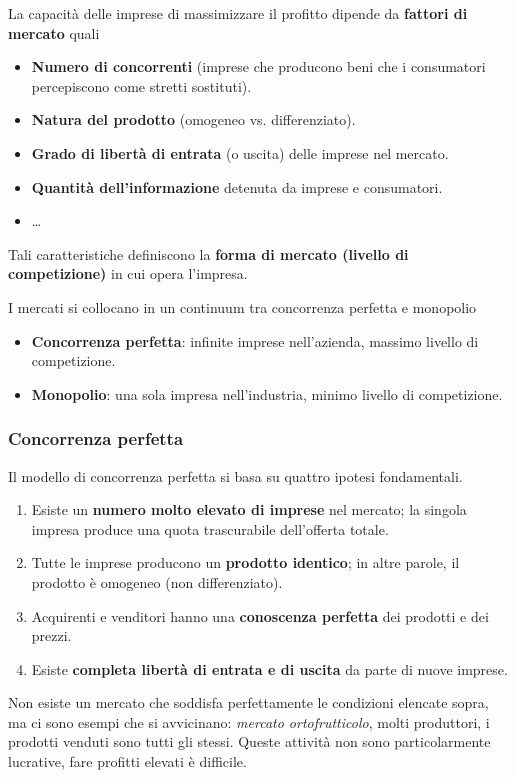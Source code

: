 \documentclass[../main.tex]{subfiles}
\begin{document}
La capacità delle imprese di massimizzare il profitto dipende da \textbf{fattori di mercato} quali
\begin{itemize}
    \item \textbf{Numero di concorrenti} (imprese che producono beni che i consumatori percepiscono come stretti sostituti).
    \item \textbf{Natura del prodotto} (omogeneo vs. differenziato).
    \item \textbf{Grado di libertà di entrata} (o uscita) delle imprese nel mercato.
    \item \textbf{Quantità dell'informazione} detenuta da imprese e consumatori.
    \item \dots
\end{itemize}

Tali caratteristiche definiscono la \textbf{forma di mercato (livello di competizione)} in cui opera l'impresa.

I mercati si collocano in un continuum tra concorrenza perfetta e monopolio
\begin{itemize}
    \item \textbf{Concorrenza perfetta}: infinite imprese nell'azienda, massimo livello di competizione.
    \item \textbf{Monopolio}: una sola impresa nell'industria, minimo livello di competizione.
\end{itemize}

\subsubsection{Concorrenza perfetta}

Il modello di concorrenza perfetta si basa su quattro ipotesi fondamentali.
\begin{enumerate}
    \item Esiste un \textbf{numero molto elevato di imprese} nel mercato; la singola impresa produce una quota trascurabile dell'offerta totale.
    \item Tutte le imprese producono un \textbf{prodotto identico}; in altre parole, il prodotto è omogeneo (non differenziato).
    \item Acquirenti e venditori hanno una \textbf{conoscenza perfetta} dei prodotti e dei prezzi.
    \item Esiste \textbf{completa libertà di entrata e di uscita} da parte di nuove imprese.
\end{enumerate}

Non esiste un mercato che soddisfa perfettamente le condizioni elencate sopra, ma ci sono esempi che si avvicinano: \emph{mercato ortofrutticolo}, molti produttori, i prodotti venduti sono tutti gli stessi. Queste attività non sono particolarmente lucrative, fare profitti elevati è difficile.
\end{document}
